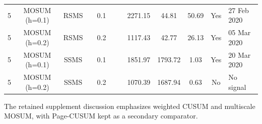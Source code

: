 \begin{table}[htbp]
\begin{tabular}{cccccccccccl}
5 & MOSUM (h=0.1) & RSMS &  & 0.1 &  &  & 2271.15 & 44.81 & 50.69 & Yes & 27 Feb 2020 \\
5 & MOSUM (h=0.2) & RSMS &  & 0.2 &  &  & 1117.43 & 42.77 & 26.13 & Yes & 05 Mar 2020 \\
5 & MOSUM (h=0.1) & SSMS &  & 0.1 &  &  & 1851.97 & 1793.72 & 1.03 & Yes & 20 Mar 2020 \\
5 & MOSUM (h=0.2) & SSMS &  & 0.2 &  &  & 1070.39 & 1687.94 & 0.63 & No & No signal \\
\bottomrule
\end{tabular}
\begin{flushleft}
\footnotesize
The retained supplement discussion emphasizes weighted CUSUM and multiscale MOSUM, with Page-CUSUM kept as a secondary comparator.
\end{flushleft}
\end{table}
